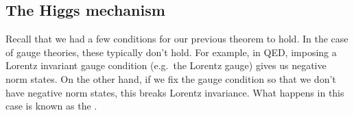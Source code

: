 \documentclass[a4paper]{article}
\begin{document}
%
%
%

\subsection{The Higgs mechanism}
Recall that we had a few conditions for our previous theorem to hold. In the case of gauge theories, these typically don't hold. For example, in QED, imposing a Lorentz invariant gauge condition (e.g.\ the Lorentz gauge) gives us negative norm states. On the other hand, if we fix the gauge condition so that we don't have negative norm states, this breaks Lorentz invariance. What happens in this case is known as the .
\end{document}

